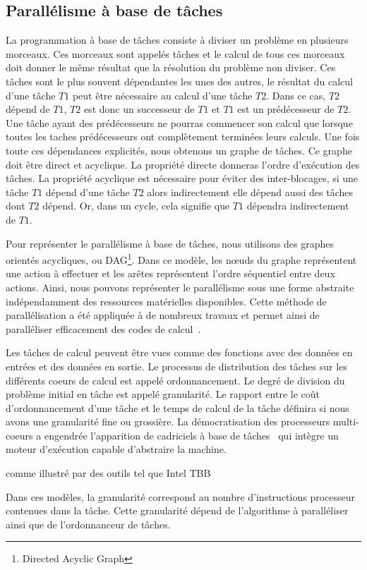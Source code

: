 \subsection{Parallélisme à base de tâches}
La programmation à base de tâches consiste à diviser un problème en plusieurs morceaux.
%
Ces morceaux sont appelés tâches et le calcul de tous ces morceaux doit donner le même résultat que la résolution du problème non diviser.
%
Ces tâches sont le plus souvent dépendantes les unes des autres, le résultat du calcul d'une tâche $T1$ peut être nécessaire au calcul d'une tâche $T2$.
%
Dans ce cas, $T2$ dépend de $T1$, $T2$ est donc un successeur de $T1$ et $T1$ est un prédécesseur de $T2$.
%
Une tâche ayant des prédécesseurs ne pourras commencer son calcul que lorsque toutes les taches prédécesseurs ont complètement terminées leurs calculs.
%
Une fois toute ces dépendances explicités, nous obtenons un graphe de tâches.
%
Ce graphe doit être direct et acyclique.
%
La propriété directe donneras l'ordre d'exécution des tâches.
%
La propriété acyclique est nécessaire pour éviter des inter-blocages, si une tâche $T1$ dépend d'une tâche $T2$ alors indirectement elle dépend aussi des tâches dont $T2$ dépend.
%
Or, dans un cycle, cela signifie que $T1$ dépendra indirectement de $T1$.



Pour représenter le parallélisme à base de tâches, nous utilisons des graphes orientés acycliques, ou DAG\footnote{Directed Acyclic Graph}.
%
Dans ce modèle, les n{\oe}uds du graphe représentent une action à effectuer et les arêtes représentent l'ordre séquentiel entre deux actions.
%
Ainsi, nous pouvons représenter le parallélisme sous une forme abstraite indépendamment des ressources matérielles disponibles.
%
Cette méthode de parallélisation a été appliquée à de nombreux travaux et permet ainsi de paralléliser efficacement des codes de calcul~\cite{BBAC2014,LSAT2013,LY2012,ABGL2013}.



Les tâches de calcul peuvent être vues comme des fonctions avec des données en entrées et des données en sortie.
%
Le processus de distribution des tâches sur les différents coeurs de calcul est appelé ordonnancement.
%
Le degré de division du problème initial en tâche est appelé granularité.
%
Le rapport entre le coût d'ordonnancement d'une tâche et le temps de calcul de la tâche définira si nous avons une granularité fine ou grossière.
%
La démocratisation des processeurs multi-coeurs a engendrée l'apparition de cadriciels à base de tâches~\cite{taskscomparison} qui intègre un moteur d'exécution capable d'abstraire la machine.

 comme illustré par des outils tel que Intel TBB~\cite{Intel_TBB}

%
Dans ces modèles, la granularité correspond au nombre d'instructions processeur contenues dans la tâche.
%
Cette granularité dépend de l'algorithme à paralléliser ainsi que de l'ordonnanceur de tâches.
